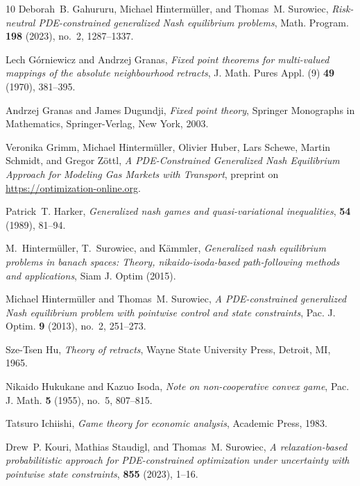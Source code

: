 \documentclass[a4paper,11pt,reqno,english]{amsart}
\theoremstyle{definition}
\begin{document}
\begin{thebibliography}{10}
	Deborah~B. Gahururu, Michael Hinterm\"uller, and Thomas~M. Surowiec, \emph{{Risk-neutral {PDE}-constrained generalized {N}ash equilibrium problems}}, Math. Program. \textbf{198} (2023), no.~2, 1287--1337.

	Lech G\'{o}rniewicz and Andrzej Granas, \emph{Fixed point theorems for multi-valued mappings of the absolute neighbourhood retracts}, J. Math. Pures Appl. (9) \textbf{49} (1970), 381--395.

	Andrzej Granas and James Dugundji, \emph{Fixed point theory}, Springer Monographs in Mathematics, Springer-Verlag, New York, 2003.

	Veronika Grimm, Michael Hinterm\"uller, Olivier Huber, Lars Schewe, Martin Schmidt, and Gregor Z\"ottl, \emph{{A {PDE}-Constrained Generalized Nash Equilibrium Approach for Modeling Gas Markets with Transport}}, preprint on \href{ https://optimization-online.org/2023/03/a-pde-constrained-generalized-nash-equilibrium-approach-for-modeling-gas-markets-with-transport/ }{https://optimization-online.org}.

	Patrick~T. Harker, \emph{Generalized nash games and quasi-variational inequalities},  \textbf{54} (1989), 81--94.

	M.~Hinterm\"{u}ller, T.~Surowiec, and K\"{a}mmler, \emph{Generalized nash equilibrium problems in banach spaces: Theory, nikaido-isoda-based path-following methods and applications}, Siam J. Optim (2015).

	Michael Hinterm\"uller and Thomas~M. Surowiec, \emph{{A {PDE}-constrained generalized {N}ash equilibrium problem with pointwise control and state constraints}}, Pac. J. Optim. \textbf{9} (2013), no.~2, 251--273.

	Sze-Tsen Hu, \emph{Theory of retracts}, Wayne State University Press, Detroit, MI, 1965.

	Nikaido Hukukane and Kazuo Isoda, \emph{Note on non-cooperative convex game}, Pac. J. Math. \textbf{5} (1955), no.~5, 807--815.

	Tatsuro Ichiishi, \emph{Game theory for economic analysis}, Academic Press, 1983.

	Drew~P. Kouri, Mathias Staudigl, and Thomas~M. Surowiec, \emph{{A relaxation-based probabilitistic approach for PDE-constrained optimization under uncertainty with pointwise state constraints}},  \textbf{855} (2023), 1--16.


\end{thebibliography}
\end{document}
